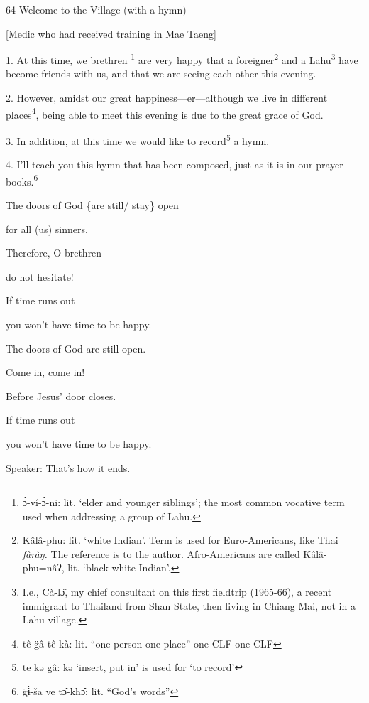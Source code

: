 
64 Welcome to the Village (with a hymn)

[Medic who had received training in Mae Taeng]

1. At this time, we brethren \footnote{ɔ̀-ví-ɔ̀-ni: lit. `elder and younger siblings'; the most common vocative term used when addressing a group of Lahu.} are very happy that a foreigner\footnote{Kâlâ-phu: lit. `white Indian'. Term is used for Euro-Americans, like Thai \textit{fàràŋ.} The reference is to the author. Afro-Americans are called Kâlâ-phu=nâʔ, lit. `black white Indian'.} and a Lahu\footnote{I.e., Cà-lɔ̂, my chief consultant on this first fieldtrip (1965-66), a recent immigrant to Thailand from Shan State, then living in Chiang Mai, not in a Lahu village.}
have become friends with us, and that we are seeing each other this evening.

2. However, amidst our great happiness---er---although we live in different places\footnote{tê  g̈â  tê    kà: lit. ``one-person-one-place''  one CLF  one CLF},
being able to meet this evening is due to the great grace of God.

3. In addition, at this time we would like to record\footnote{te kə gâ: kə `insert, put in' is used for `to record'} a hymn.

4. I'll teach you this hymn that has been composed, just as it is in our prayer-books.\footnote{g̈ɨ̀-ša ve tɔ̂-khɔ̂: lit. ``God's words''}

The doors of God \{are still/ stay\} open

for all (us) sinners.

Therefore, O brethren

do not hesitate!

If time runs out

you won't have time to be happy.

The doors of God are still open.

Come in, come in!

Before Jesus' door closes.

If time runs out

you won't have time to be happy.

Speaker: That's how it ends.

